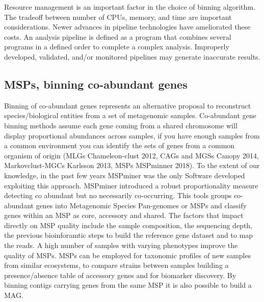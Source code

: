 \documentclass{article}
\begin{document}
Resource management is an important factor in the choice of binning algorithm.
The tradeoff between number of \glspl{CPU}, memory, and time are important considerations.
Newer advances in pipeline technologies have ameliorated these costs.
An analysis pipeline is defined as a program that combines several programs in a defined order to complete a complex analysis.
Improperly developed, validated, and/or monitored pipelines may generate inaccurate results.

\subsection*{MSPs, binning co-abundant genes}
Binning of co-abundant genes represents an alternative proposal to reconstruct species/biological entities from a set of metagenomic samples.
Co-abundant gene binning methods assume each gene coming from a shared chromosome will display proportional abundances across samples, if you have enough samples from a common environment you can identify the sets of genes from a common organism of origin (MLGs Chameleon-clust 2012, CAGs and MGSs Canopy 2014, Markovclust-MGCs Karlsson 2013, MSPs MSPminner 2018).
To the extent of our knowledge, in the past few years MSPminer was the only Software developed exploiting this approach. MSPminer introduced a robust proportionality measure detecting co abundant but no necessarily co-occurring.
This tools groups co-abundant genes into Metagenomic Species Pan-genomes or \glspl{MSP} and classify genes within an MSP as core, accessory and shared.  
The factors that impact directly on \gls{MSP} quality include the sample composition, the sequencing depth, the previous bioinforamtic steps to build the reference gene dataset and to map the reads.
A high number of samples with varying phenotypes improve the quality of \glspl{MSP}.
MSPs can be employed for taxonomic profiles of new samples from similar ecosystems, to compare strains between samples building a presence/absence table of accessory genes and for biomarker discovery.
By binning contigs carrying genes from the same MSP it is also possible to build a \gls{MAG}.
\end{document}
